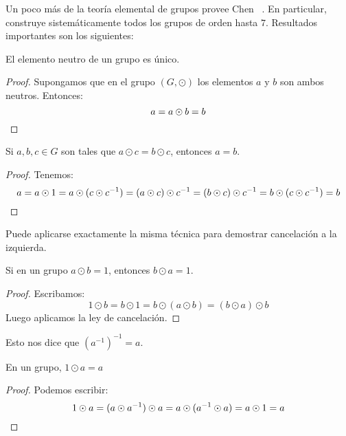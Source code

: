   Un poco más de la teoría elemental de grupos
  provee Chen~%
    \cite[capítulo 4]{chen08:_misc_topics_first_year_math}.
  En particular,
  construye sistemáticamente todos los grupos de orden hasta \(7\).
  Resultados importantes son los siguientes:
  \begin{theorem}
    \label{theo:group-unique-identity}
    El elemento neutro de un grupo es único.
  \end{theorem}
  \begin{proof}
    Supongamos que en el grupo \((G, \odot)\)
    los elementos \(a\) y \(b\) son ambos neutros.
    Entonces:
    \begin{equation*}
      a = a \odot b = b
      \qedhere
    \end{equation*}
  \end{proof}
  \begin{theorem}
    \label{theo:group-cancellation}
    Si \(a, b, c \in G\) son tales que
    \(a \odot c = b \odot c\),
    entonces \(a = b\).
  \end{theorem}
  \begin{proof}
    Tenemos:
    \begin{equation*}
      a
	= a \odot 1
	= a \odot (c \odot c^{-1})
	= (a \odot c) \odot c^{-1}
	= (b \odot c) \odot c^{-1}
	= b \odot (c \odot c^{-1})
	= b
      \qedhere
    \end{equation*}
  \end{proof}
  Puede aplicarse exactamente la misma técnica
  para demostrar cancelación a la izquierda.
  \begin{theorem}[Mutualidad]
    \label{theo:group-mutuality}
    Si en un grupo \(a \odot b = 1\),
    entonces \(b \odot a = 1\).
  \end{theorem}
  \begin{proof}
    Escribamos:
    \begin{equation*}
      1 \odot b
	= b \odot 1
	= b \odot (a \odot b)
	= (b \odot a) \odot b
    \end{equation*}
    Luego aplicamos la ley de cancelación.
  \end{proof}
  Esto nos dice que \((a^{-1})^{-1} = a\).
  \begin{theorem}
    \label{theo:group-two-sided-identity}
    En un grupo,
    \(1 \odot a = a\)
  \end{theorem}
  \begin{proof}
    Podemos escribir:
    \begin{equation*}
      1 \odot a
	= (a \odot a^{-1}) \odot a
	= a \odot (a^{-1} \odot a)
	= a \odot 1
	= a
      \qedhere
    \end{equation*}
  \end{proof}
